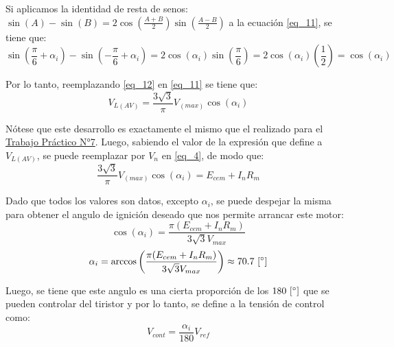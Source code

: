 \documentclass[12pt,a4paper]{article}
\begin{document}
\begin{itemize}
    Si aplicamos la identidad de resta de senos: $\sin(A) - \sin(B) = 2 \cos\left(\frac{A+B}{2}\right) \sin\left(\frac{A-B}{2}\right)$ a la ecuación \eqref{eq_11}, se tiene que:
    \begin{equation}
        \sin(\frac{\pi}{6} + \alpha_{i}) - \sin(-\frac{\pi}{6} + \alpha_{i}) =2\cos(\alpha_{i}) \sin\left(\frac{\pi}{6}\right) = 2 \cos(\alpha_{i}) \left(\frac{1}{2}\right) = \cos(\alpha_{i})
        \label{eq_12}
    \end{equation}
    
    Por lo tanto, reemplazando \eqref{eq_12} en \eqref{eq_11} se tiene que:
    \begin{equation}
        V_{L(AV)} = \frac{3\sqrt{3}}{\pi} V_{(max)} \cos(\alpha_{i})
        \label{eq_13}
    \end{equation}

    Nótese que este desarrollo es exactamente el mismo que el realizado para el \href{https://github.com/ErnestMonja/Electronica-Industrial/blob/main/TPT7%20%20%20-%20Circuito%20de%20Disparo%20para%20Tiristores/Monja.TPT7.EI2026.pdf}{Trabajo Práctico N°7}. Luego, sabiendo el valor de la expresión que define a $V_{L(AV)}$, se puede reemplazar por $V_{n}$ en \eqref{eq_4}, de modo que:
    \begin{equation}
        \frac{3\sqrt{3}}{\pi} V_{(max)} \cos(\alpha_{i}) = E_{cem} + I_{n}R_{m}
        \label{eq_14}
    \end{equation}

    Dado que todos los valores son datos, excepto $\alpha_{i}$, se puede despejar la misma para obtener el angulo de ignición deseado que nos permite arrancar este motor:
    \begin{equation}
        \cos(\alpha_{i}) = \frac{\pi (E_{cem} + I_{n}R_{m})}{3\sqrt{3} V_{max}}
        \label{eq_15}
    \end{equation}
    \begin{equation}
        \alpha_{i} = \arccos\left(\frac{\pi (E_{cem} + I_{n}R_{m})}{3\sqrt{3} V_{max}}\right) \approx 70.7 \ [\degree]
        \label{eq_16}
    \end{equation}

    Luego, se tiene que este angulo es una cierta proporción de los $180 \ [\degree]$ que se pueden controlar del tiristor y por lo tanto, se define a la tensión de control como:
    \begin{equation}
        V_{cont} = \frac{\alpha_i}{180} V_{ref}
        \label{eq_17}
    \end{equation}


\end{itemize}
\end{document}
